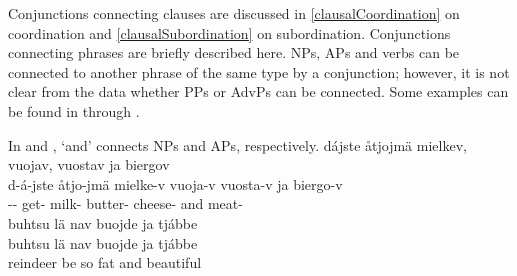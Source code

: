 \begin{table}[h]
\end{table}

Conjunctions connecting clauses are discussed in \SEC\ref{clausalCoordination} on coordination and \SEC\ref{clausalSubordination} on subordination. 
Conjunctions connecting phrases are briefly described here. 
NPs, APs and verbs can be connected to another phrase of the same type by a conjunction; however, it is not clear from the data whether PPs or AdvPs can be connected. 
Some examples can be found in  through . 

In  and ,  ‘and’ connects NPs and APs, respectively. 
\ea\label{conjunctionEx1}%
\glll	dájste åtjojmä mielkev, vuojav, vuostav ja biergov\\
	d-á-jste åtjo-jmä mielke-v vuoja-v vuosta-v ja biergo-v\\
	-- get- milk- butter- cheese- and meat-\\\nopagebreak
{}	
\z
\ea\label{conjunctionEx2}%
\glll	buhtsu lä nav buojde ja tjábbe\\
	buhtsu lä nav buojde ja tjábbe\\
	reindeer\BS{} be\BS{} so fat\BS{} and beautiful\BS{} \\\nopagebreak
{}	
\z

